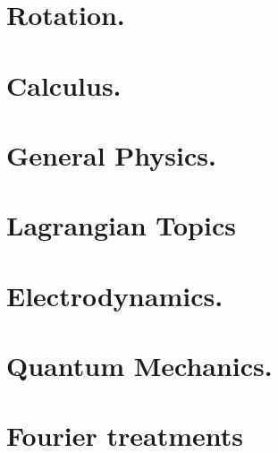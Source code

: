\documentclass[12pt,leqno]{book}
\begin{document}
\part{Rotation.}





\part{Calculus.}





\part{General Physics.}







\part{Lagrangian Topics}




\part{Electrodynamics.}









\part{Quantum Mechanics.}


\part{Fourier treatments}








\end{document}
